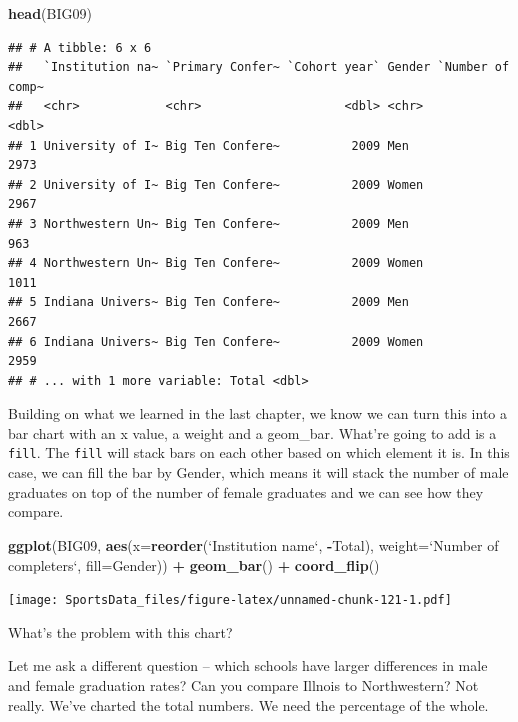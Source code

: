\documentclass[]{book}
\newenvironment{Shaded}{\begin{snugshade}}{\end{snugshade}}
\newcommand{\KeywordTok}[1]{\textcolor[rgb]{0.13,0.29,0.53}{\textbf{#1}}}
\newcommand{\DataTypeTok}[1]{\textcolor[rgb]{0.13,0.29,0.53}{#1}}
\newcommand{\StringTok}[1]{\textcolor[rgb]{0.31,0.60,0.02}{#1}}
\newcommand{\OperatorTok}[1]{\textcolor[rgb]{0.81,0.36,0.00}{\textbf{#1}}}
\newcommand{\NormalTok}[1]{#1}
\begin{document}
\begin{Shaded}
\begin{Highlighting}[]
\KeywordTok{head}\NormalTok{(BIG09)}
\end{Highlighting}
\end{Shaded}

\begin{verbatim}
## # A tibble: 6 x 6
##   `Institution na~ `Primary Confer~ `Cohort year` Gender `Number of comp~
##   <chr>            <chr>                    <dbl> <chr>             <dbl>
## 1 University of I~ Big Ten Confere~          2009 Men                2973
## 2 University of I~ Big Ten Confere~          2009 Women              2967
## 3 Northwestern Un~ Big Ten Confere~          2009 Men                 963
## 4 Northwestern Un~ Big Ten Confere~          2009 Women              1011
## 5 Indiana Univers~ Big Ten Confere~          2009 Men                2667
## 6 Indiana Univers~ Big Ten Confere~          2009 Women              2959
## # ... with 1 more variable: Total <dbl>
\end{verbatim}

Building on what we learned in the last chapter, we know we can turn
this into a bar chart with an x value, a weight and a geom\_bar. What're
going to add is a \texttt{fill}. The \texttt{fill} will stack bars on
each other based on which element it is. In this case, we can fill the
bar by Gender, which means it will stack the number of male graduates on
top of the number of female graduates and we can see how they compare.

\begin{Shaded}
\begin{Highlighting}[]
\KeywordTok{ggplot}\NormalTok{(BIG09, }\KeywordTok{aes}\NormalTok{(}\DataTypeTok{x=}\KeywordTok{reorder}\NormalTok{(}\StringTok{`}\DataTypeTok{Institution name}\StringTok{`}\NormalTok{, }\OperatorTok{-}\NormalTok{Total), }\DataTypeTok{weight=}\StringTok{`}\DataTypeTok{Number of completers}\StringTok{`}\NormalTok{, }\DataTypeTok{fill=}\NormalTok{Gender)) }\OperatorTok{+}\StringTok{ }\KeywordTok{geom_bar}\NormalTok{() }\OperatorTok{+}\StringTok{ }\KeywordTok{coord_flip}\NormalTok{()}
\end{Highlighting}
\end{Shaded}

\texttt{[image: SportsData\_files/figure-latex/unnamed-chunk-121-1.pdf]}

What's the problem with this chart?

Let me ask a different question -- which schools have larger differences
in male and female graduation rates? Can you compare Illnois to
Northwestern? Not really. We've charted the total numbers. We need the
percentage of the whole.
\end{document}
